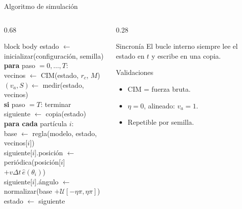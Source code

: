 \documentclass[aspectratio=169,11pt]{beamer}
\begin{document}
\begin{frame}{Algoritmo de simulación}
  \begin{columns}[T,onlytextwidth]
    \begin{column}{0.68\textwidth}
      \begin{beamercolorbox}[sep=0.6em,rounded=true]{block body}
        {\small\ttfamily
        estado $\leftarrow$ inicializar(configuración, semilla)\\[0.25em]
        \textbf{para} paso $=0,\ldots,T$:\\
        \quad vecinos $\leftarrow$ CIM(estado, $r_c$, $M$)\\
        \quad $(v_a,S) \leftarrow$ medir(estado, vecinos)\\
        \quad \textbf{si} paso $=T$: terminar\\
        \quad siguiente $\leftarrow$ copia(estado)\\
        \quad \textbf{para cada} partícula $i$:\\
        \qquad base $\leftarrow$ regla(modelo, estado, vecinos[$i$])\\
        \qquad siguiente[$i$].posición $\leftarrow$\\
        \qquad\quad periódica(posición[$i$] $+v\Delta t\,\hat{e}(\theta_i)$)\\
        \qquad siguiente[$i$].ángulo $\leftarrow$\\
        \qquad\quad normalizar(base $+\mathcal U[-\eta\pi,\eta\pi]$)\\
        \quad estado $\leftarrow$ siguiente
        }
      \end{beamercolorbox}
    \end{column}
    \begin{column}{0.28\textwidth}
      \begin{block}{Sincronía}
        El bucle interno siempre lee el estado en $t$ y escribe en una copia.
      \end{block}
      \begin{block}{Validaciones}
        \begin{itemize}
          \item CIM = fuerza bruta.
          \item $\eta=0$, alineado: $v_a=1$.
          \item Repetible por semilla.
        \end{itemize}
      \end{block}
    \end{column}
  \end{columns}
\end{frame}
\end{document}

